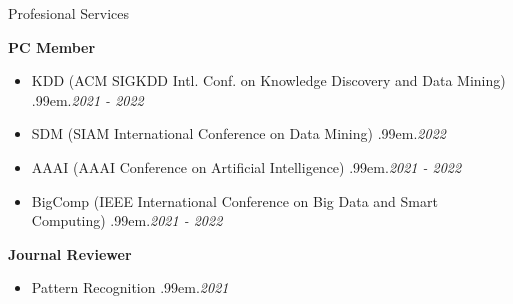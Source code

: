 \documentclass{resume} %
\makeatletter
\newcommand \Dotfill {\leavevmode \cleaders \hb@xt@ .99em{\hss .\hss }\hfill \kern \z@}
\makeatother
\begin{document}
\begin{rSection}{Profesional Services}

\textbf{PC Member}
\begin{itemize}[noitemsep]
	\item KDD {\small (ACM SIGKDD Intl. Conf. on Knowledge Discovery and Data Mining)} \smallskip \Dotfill \emph{2021 - 2022}
	\item SDM {\small (SIAM International Conference on Data Mining)} \smallskip \Dotfill \emph{2022}
	\item AAAI {\small (AAAI Conference on Artificial Intelligence)} \smallskip \Dotfill \emph{2021 - 2022}
	\item BigComp {\small (IEEE International Conference on Big Data and Smart Computing)} \smallskip \Dotfill \emph{2021 - 2022}
\end{itemize}

\textbf{Journal Reviewer}
\begin{itemize}[noitemsep]
	\item Pattern Recognition \smallskip \Dotfill \emph{2021}
\end{itemize}


\end{rSection}

\end{document}
